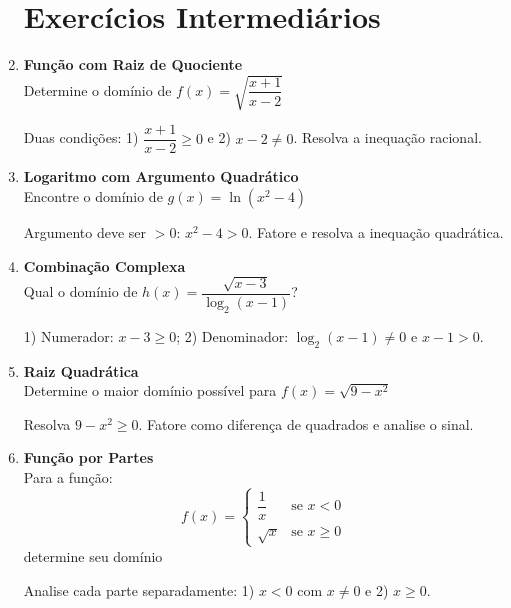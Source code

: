 \documentclass[11pt]{article}
\begin{document}
\begin{multicols}{2}
\begin{enumerate}
\section*{Exercícios Intermediários}

\item \textbf{Função com Raiz de Quociente}\\
Determine o domínio de $f(x) = \sqrt{\dfrac{x+1}{x-2}}$
\begin{tcolorbox}[colback=explanationbg,colframe=titleblue,title=Dica:]
Duas condições: 1) $\dfrac{x+1}{x-2} \geq 0$ e 2) $x-2 \neq 0$. Resolva a inequação racional.
\end{tcolorbox}

\item \textbf{Logaritmo com Argumento Quadrático}\\
Encontre o domínio de $g(x) = \ln(x^2-4)$
\begin{tcolorbox}[colback=explanationbg,colframe=titleblue,title=Dica:]
Argumento deve ser $>0$: $x^2-4>0$. Fatore e resolva a inequação quadrática.
\end{tcolorbox}

\item \textbf{Combinação Complexa}\\
Qual o domínio de $h(x) = \dfrac{\sqrt{x-3}}{\log_2(x-1)}$?
\begin{tcolorbox}[colback=explanationbg,colframe=titleblue,title=Dica:]
1) Numerador: $x-3 \geq 0$; 2) Denominador: $\log_2(x-1) \neq 0$ e $x-1>0$.
\end{tcolorbox}

\item \textbf{Raiz Quadrática}\\
Determine o maior domínio possível para $f(x) = \sqrt{9-x^2}$
\begin{tcolorbox}[colback=explanationbg,colframe=titleblue,title=Dica:]
Resolva $9-x^2 \geq 0$. Fatore como diferença de quadrados e analise o sinal.
\end{tcolorbox}

\item \textbf{Função por Partes}\\
Para a função:
\[ f(x) = \begin{cases} 
\dfrac{1}{x} & \text{se } x < 0 \\
\sqrt{x} & \text{se } x \geq 0 
\end{cases} \]
determine seu domínio
\begin{tcolorbox}[colback=explanationbg,colframe=titleblue,title=Dica:]
Analise cada parte separadamente: 1) $x<0$ com $x\neq0$ e 2) $x\geq0$.
\end{tcolorbox}


\end{enumerate}
\end{multicols}
\end{document}
